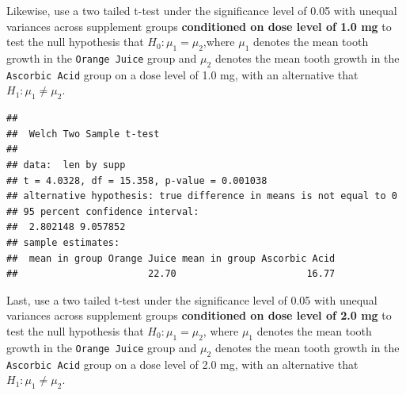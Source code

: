 \documentclass[]{article}
\newenvironment{Shaded}{\begin{snugshade}}{\end{snugshade}}
\newcommand{\KeywordTok}[1]{\textcolor[rgb]{0.13,0.29,0.53}{\textbf{#1}}}
\newcommand{\DataTypeTok}[1]{\textcolor[rgb]{0.13,0.29,0.53}{#1}}
\newcommand{\DecValTok}[1]{\textcolor[rgb]{0.00,0.00,0.81}{#1}}
\newcommand{\StringTok}[1]{\textcolor[rgb]{0.31,0.60,0.02}{#1}}
\newcommand{\OperatorTok}[1]{\textcolor[rgb]{0.81,0.36,0.00}{\textbf{#1}}}
\newcommand{\NormalTok}[1]{#1}
\begin{document}
Likewise, use a two tailed t-test under the significance level of 0.05
with unequal variances across supplement groups \textbf{conditioned on
dose level of 1.0 mg} to test the null hypothesis that
\(H_0: \mu_1=\mu_2\),where \(\mu_1\) denotes the mean tooth growth in
the \texttt{Orange\ Juice} group and \(\mu_2\) denotes the mean tooth
growth in the \texttt{Ascorbic\ Acid} group on a dose level of 1.0 mg,
with an alternative that \(H_1: \mu_1\ne\mu_2\).

\begin{Shaded}
\end{Shaded}

\begin{verbatim}
## 
##  Welch Two Sample t-test
## 
## data:  len by supp
## t = 4.0328, df = 15.358, p-value = 0.001038
## alternative hypothesis: true difference in means is not equal to 0
## 95 percent confidence interval:
##  2.802148 9.057852
## sample estimates:
##  mean in group Orange Juice mean in group Ascorbic Acid 
##                       22.70                       16.77
\end{verbatim}

Last, use a two tailed t-test under the significance level of 0.05 with
unequal variances across supplement groups \textbf{conditioned on dose
level of 2.0 mg} to test the null hypothesis that \(H_0: \mu_1=\mu_2\),
where \(\mu_1\) denotes the mean tooth growth in the
\texttt{Orange\ Juice} group and \(\mu_2\) denotes the mean tooth growth
in the \texttt{Ascorbic\ Acid} group on a dose level of 2.0 mg, with an
alternative that \(H_1: \mu_1\ne\mu_2\).

\begin{Shaded}
\end{Shaded}
\end{document}
